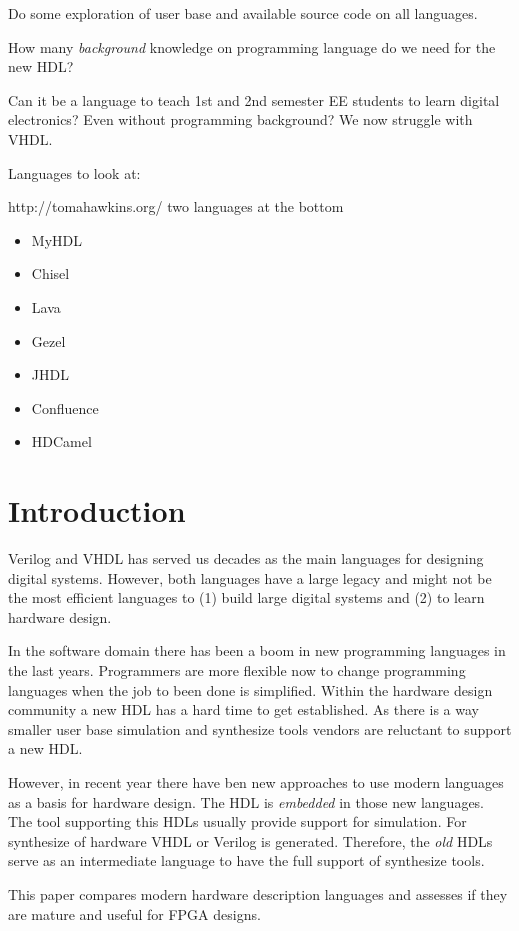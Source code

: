 \documentclass[10pt, technote, draftcls, onecolumn]{IEEEtran}
\begin{document}
Do some exploration of user base and available source code on all languages.

How many \emph{background} knowledge on programming language do we need for the new HDL?

Can it be a language to teach 1st and 2nd semester EE students to learn digital
electronics? Even without programming background? We now struggle with VHDL.

Languages to look at:

http://tomahawkins.org/ two languages at the bottom

\begin{itemize}
   \item MyHDL
   \item Chisel
   \item Lava
   \item Gezel
   \item JHDL
   \item Confluence
   \item HDCamel
\end{itemize}

\section{Introduction}

Verilog and VHDL has served us decades as the main languages for designing
digital systems. However, both languages have a large legacy and might not be
the most efficient languages to (1) build large digital systems and (2) to learn
hardware design.

In the software domain there has been a boom in new programming languages
in the last years. Programmers are more flexible now to change programming
languages when the job to been done is simplified. Within the hardware design
community a new HDL has a hard time to get established. As there is a way
smaller user base simulation and synthesize tools vendors are reluctant to
support a new HDL.

However, in recent year there have ben new approaches to use modern
languages as a basis for hardware design. The HDL is \emph{embedded}
in those new languages. The tool supporting this HDLs usually provide
support for simulation. For synthesize of hardware VHDL or Verilog is
generated. Therefore, the \emph{old} HDLs serve as an intermediate
language to have the full support of synthesize tools.

This paper compares modern hardware description languages and
assesses if they are mature and useful for FPGA designs.
\end{document}
